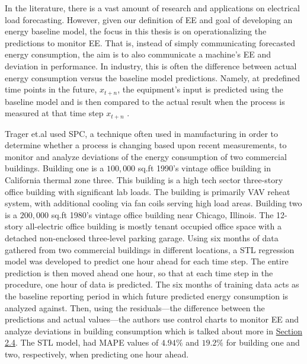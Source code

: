 In the literature, there is a vast amount of research and applications on electrical load forecasting. However, given our definition of EE and goal of developing an energy baseline model, the focus in this thesis is on operationalizing the predictions to monitor EE. That is, instead of simply communicating forecasted energy consumption, the aim is to also communicate a machine's EE and deviation in performance. In industry, this is often the difference between actual energy consumption versus the baseline model predictions. Namely, at predefined time points in the future, $x_{t+n}$, the equipment's input is predicted using the baseline model and is then compared to the actual result when the process is measured at that time step $x_{t+n}$ \cite{tightening}. 

Trager et.al \cite{tightening} used SPC, a technique often used in manufacturing in order to determine whether a process is changing based upon recent measurements, to monitor and analyze deviations of the energy consumption of two commercial buildings. Building one is a $100,000$ \ac{sq.ft} 1990’s vintage office building in California thermal zone three. This building is a high tech sector three-story office building with significant lab loads. The building is primarily \ac{VAV} reheat system, with additional cooling via fan coils serving high load areas. Building two is a $200,000$ sq.ft 1980’s vintage office building near Chicago, Illinois. The 12-story all-electric office building is mostly tenant occupied office space with a detached non-enclosed three-level parking garage. Using six months of data gathered from two commercial buildings in different locations, a \ac{STL} regression model was developed to predict one hour ahead for each time step. The entire prediction is then moved ahead one hour, so that at each time step in the procedure, one hour of data is predicted. The six months of training data acts as the baseline reporting period in which future predicted energy consumption is analyzed against. Then, using the residuals—the difference between the predictions and actual values—the authors use control charts to monitor EE and analyze deviations in building consumption which is talked about more in \hyperlink{subsection.2.4}{Section 2.4}. The STL model, had \ac{MAPE} values of $4.94\%$ and $19.2\%$ for building one and two, respectively, when predicting one hour ahead.

